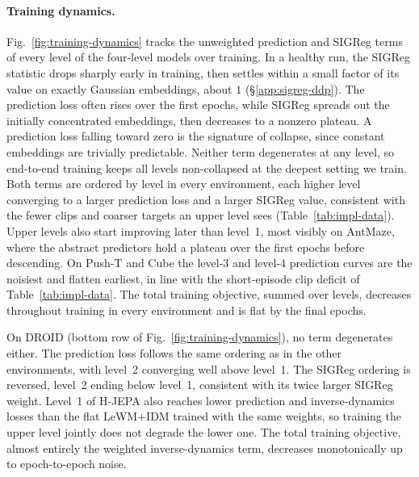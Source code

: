 \paragraph{Training dynamics.} Fig.~\ref{fig:training-dynamics} tracks the
unweighted prediction and SIGReg terms of every level of the four-level models
over training. In a healthy run, the SIGReg statistic drops sharply early in
training, then settles within a small factor of its value on exactly Gaussian
embeddings, about $1$ (\S\ref{app:sigreg-ddp}). The prediction
loss often rises over the first epochs, while SIGReg spreads out the initially
concentrated embeddings, then decreases to a nonzero plateau. A prediction loss
falling toward zero is the signature of collapse, since constant embeddings are
trivially predictable. Neither term degenerates at any level, so
end-to-end training keeps all levels non-collapsed at the deepest setting we
train. Both terms are ordered by level in every environment, each higher level
converging to a larger prediction loss and a larger SIGReg value, consistent with
the fewer clips and coarser targets an upper level sees
(Table~\ref{tab:impl-data}). Upper levels also start improving later than
level~1, most visibly on AntMaze, where the abstract predictors hold a plateau
over the first epochs before descending. On Push-T and Cube the level-3 and
level-4 prediction curves are the noisiest and flatten earliest, in line with
the short-episode clip deficit of Table~\ref{tab:impl-data}. The total
training objective, summed over levels, decreases throughout training in every
environment and is flat by the final epochs.

On DROID (bottom row of Fig.~\ref{fig:training-dynamics}), no term degenerates
either. The prediction loss follows the same ordering as in the other
environments, with level~2 converging well above level~1. The SIGReg ordering is
reversed, level~2 ending below level~1, consistent with its twice larger SIGReg
weight. Level~1 of H-JEPA also reaches lower prediction and inverse-dynamics
losses than the flat LeWM+IDM trained with the same weights, so training the
upper level jointly does not degrade the lower one. The total training objective, almost
entirely the weighted inverse-dynamics term, decreases monotonically up to
epoch-to-epoch noise.

